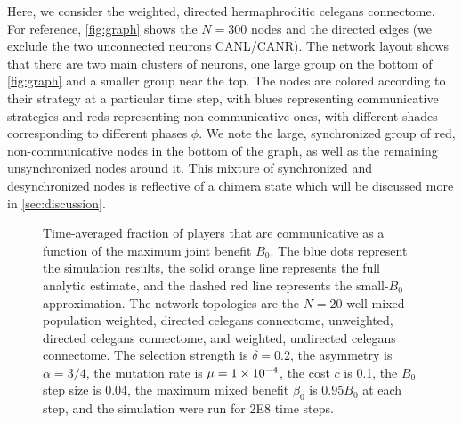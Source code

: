 \documentclass[pdflatex,lineno,referee,sn-mathphys-ay]{sn-jnl}
\begin{document}
Here, we consider the weighted, directed hermaphroditic \gls{celegans} connectome.
For reference, \cref{fig:graph} shows the $N = 300$ nodes and the directed edges
(we exclude the two unconnected neurons CANL/CANR).
The network layout shows that there are two main clusters of neurons,
one large group on the bottom of \cref{fig:graph} and a smaller group
near the top.
The nodes are colored according to their strategy at a particular time step,
with blues representing communicative strategies
and reds representing non-communicative ones,
with different shades corresponding to different phases $\phi$.
We note the large, synchronized group
of red, non-communicative nodes in the bottom of the graph,
as well as the remaining unsynchronized nodes around it.
This mixture of synchronized and desynchronized nodes
is reflective of a chimera state which will be discussed more
in \cref{sec:discussion}.

\begin{figure}
  \centering
  
  \caption{
    Time-averaged fraction of players that are communicative as a function
    of the maximum joint benefit $B_0$.
    The blue dots represent the simulation results,
    the solid orange line represents the full analytic estimate,
    and the dashed red line represents the small-$B_0$ approximation.
    The network topologies are the
    $N=20$ well-mixed population
    weighted, directed \gls{celegans} connectome,
    unweighted, directed \gls{celegans} connectome,
    and
    weighted, undirected \gls{celegans} connectome.
    The selection strength is $\delta=0.2$,
    the asymmetry is $\alpha=3/4$,
    the mutation rate is $\mu=\num{1E-4}$,
    the cost $c$ is \num{0.1},
    the $B_0$ step size is \num{0.04},
    the maximum mixed benefit $\beta_0$ is $\num{0.95} B_0$ at each step,
    and the simulation were run for \num{2E8} time steps.
  }
  \label{fig:comm-frac}
\end{figure}
\end{document}
